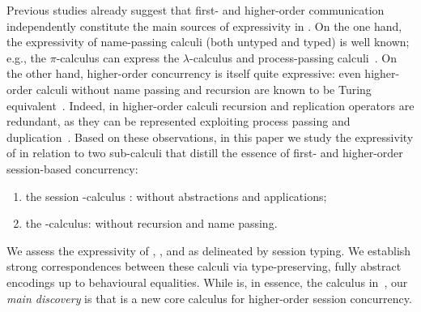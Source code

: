 Previous studies already suggest 
that first- and higher-order com\-mu\-ni\-cation %
independently constitute 
the main sources 
of expressivity in \HOp. %
On the one hand, the expressivity of name-passing calculi (both untyped and typed) is well known; e.g., the $\pi$-calculus can express the $\lambda$-calculus and 
process-passing calculi~\cite{SangiorgiD:expmpa}. 
On the other hand, higher-order concurrency is itself quite expressive: 
even higher-order calculi without name passing and recursion are known to be Turing equivalent~\cite{DBLP:journals/iandc/LanesePSS11}.
Indeed, in higher-order calculi
recursion and replication operators are redundant, as they can be represented exploiting process passing and duplication~\cite{ThomsenB:plachoasgcfhop}. 
Based on these observations, 
in this paper we study the expressivity of \HOp in relation to two  sub-calculi
that distill the essence of first- and higher-order session-based concurrency:
\begin{enumerate}[-]
\item the session \sessp-calculus : \HOp without abstractions and applications;
\item the \HO-calculus: \HOp without recursion and name passing.
\end{enumerate}
We assess the expressivity 
 of \HOp, \HO, and \sessp as delineated by session typing. 
We establish strong correspondences between 
these calculi  via type-preserving, fully abstract encodings up to 
behavioural equalities. 
While \sessp is, 
in essence, the calculus in~\cite{honda.vasconcelos.kubo:language-primitives}, 
our \emph{main discovery} is 
that \HO  is a new core calculus 
for higher-order session concurrency.



